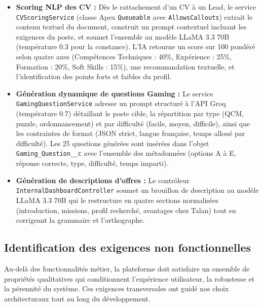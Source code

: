 \begin{itemize}
\begin{itemize}
    \item \textbf{Scoring NLP des CV :} Dès le rattachement d'un CV à un Lead, le service \texttt{CVScoringService} (classe Apex \texttt{Queueable} avec \texttt{AllowsCallouts}) extrait le contenu textuel du document, construit un prompt contextuel incluant les exigences du poste, et soumet l'ensemble au modèle LLaMA 3.3 70B (température 0.3 pour la constance). L'IA retourne un score sur 100 pondéré selon quatre axes (Compétences Techniques : 40\%, Expérience : 25\%, Formation : 20\%, Soft Skills : 15\%), une recommandation textuelle, et l'identification des points forts et faibles du profil.
    \item \textbf{Génération dynamique de questions Gaming :} Le service \texttt{GamingQuestionService} adresse un prompt structuré à l'API Groq (température 0.7) détaillant le poste cible, la répartition par type (QCM, puzzle, ordonnancement) et par difficulté (facile, moyen, difficile), ainsi que les contraintes de format (JSON strict, langue française, temps alloué par difficulté). Les 25 questions générées sont insérées dans l'objet \texttt{Gaming\_Question\_\_c} avec l'ensemble des métadonnées (options A à E, réponse correcte, type, difficulté, temps imparti).
    \item \textbf{Génération de descriptions d'offres :} Le contrôleur \texttt{InternalDashboardController} soumet un brouillon de description au modèle LLaMA 3.3 70B qui le restructure en quatre sections normalisées (introduction, missions, profil recherché, avantages chez Talan) tout en corrigeant la grammaire et l'orthographe.
\end{itemize}

\end{itemize}

\subsection{Identification des exigences non fonctionnelles}

Au-delà des fonctionnalités métier, la plateforme doit satisfaire un ensemble de propriétés qualitatives qui conditionnent l'expérience utilisateur, la robustesse et la pérennité du système. Ces exigences transversales ont guidé nos choix architecturaux tout au long du développement.

